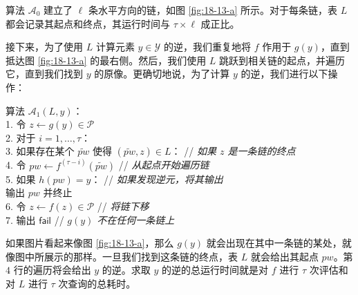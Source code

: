 \begin{snote}
算法 $\mathcal{A}_0$ 建立了 $\ell$ 条水平方向的链，如图 \ref{fig:18-13-a} 所示。对于每条链，表 $L$ 都会记录其起点和终点，其运行时间与 $\tau\times\ell$ 成正比。

接下来，为了使用 $L$ 计算元素 $y\in\mathcal{Y}$ 的逆，我们重复地将 $f$ 作用于 $g(y)$，直到抵达图 \ref{fig:18-13-a} 的最右侧。然后，我们使用 $L$ 跳跃到相关链的起点，并遍历它，直到我们找到 $y$ 的原像。更确切地说，为了计算 $y$ 的逆，我们进行以下操作：

\vspace*{10pt}

\hspace*{5pt} 算法 $\mathcal{A}_1(L,y)$：\\
\hspace*{26pt} 1. \quad 令 $z\leftarrow g(y)\in\mathcal{P}$\\
\hspace*{26pt} 2. \quad 对于 $i=1,\dots,\tau$：\\
\hspace*{26pt} 3. \quad\qquad 如果存在某个 $\widetilde{pw}$ 使得 $(\widetilde{pw},z)\in L$：
\hspace*{20pt} // \emph{如果 $z$ 是一条链的终点} \\
\hspace*{26pt} 4. \quad\qquad\qquad 令 $pw\leftarrow f^{(\tau-i)}(\widetilde{pw})$
\hspace*{73.5pt} // \emph{从起点开始遍历链} \\
\hspace*{26pt} 5. \quad\qquad\qquad 如果 $h(pw)=y$：
\hspace*{87pt} // \emph{如果发现逆元，将其输出} \\
\hspace*{116pt} 输出 $pw$ 并终止\\
\hspace*{26pt} 6. \quad\qquad 令 $z\leftarrow f(z)\in\mathcal{P}$
\hspace*{109pt} // \emph{将链下移} \\
\hspace*{26pt} 7. \quad 输出 $\mathsf{fail}$
\hspace*{168.5pt} // \emph{$g(y)$ 不在任何一条链上}

\vspace*{10pt}

如果图片看起来像图 \ref{fig:18-13-a}，那么 $g(y)$ 就会出现在其中一条链的某处，就像图中所展示的那样。一旦我们找到这条链的终点，表 $L$ 就会给出其起点 $pw$。第 $4$ 行的遍历将会给出 $y$ 的逆。求取 $y$ 的逆的总运行时间就是对 $f$ 进行 $\tau$ 次评估和对 $L$ 进行 $\tau$ 次查询的总耗时。


\end{snote}
